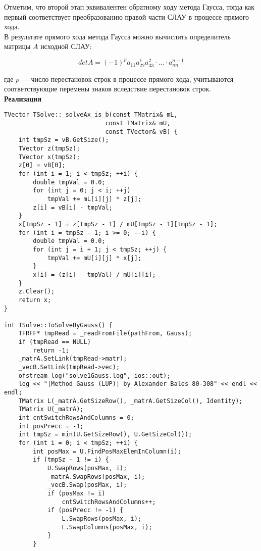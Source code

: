 Отметим, что второй этап эквивалентен обратному ходу метода Гаусса, тогда как первый соответствует преобразованию правой части СЛАУ в процессе прямого хода.\\

В результате прямого хода метода Гаусса можно вычислить определитель матрицы $A$ исходной СЛАУ:

$$
det A=(-1)^pa_{11}a_{22}^1a_{33}^2 \cdot ... \cdot a_{nn}^{n-1}
$$

где $p$ --- число перестановок строк в процессе прямого хода, учитываются соответствующие перемены знаков вследствие перестановок строк.\\

\textbf{Реализация}

\begin{lstlisting}
TVector TSolve::_solveAx_is_b(const TMatrix& mL, 
                            const TMatrix& mU, 
                            const TVector& vB) {
    int tmpSz = vB.GetSize();    
	TVector z(tmpSz);
    TVector x(tmpSz);
	z[0] = vB[0];	
    for (int i = 1; i < tmpSz; ++i) {
        double tmpVal = 0.0;
        for (int j = 0; j < i; ++j)
            tmpVal += mL[i][j] * z[j];
        z[i] = vB[i] - tmpVal;
    }    
    x[tmpSz - 1] = z[tmpSz - 1] / mU[tmpSz - 1][tmpSz - 1];    
    for (int i = tmpSz - 1; i >= 0; --i) {
        double tmpVal = 0.0;
        for (int j = i + 1; j < tmpSz; ++j) {
            tmpVal += mU[i][j] * x[j];
        }
        x[i] = (z[i] - tmpVal) / mU[i][i];
    }
    z.Clear();
    return x;
}

int TSolve::ToSolveByGauss() {                 
    TFRFF* tmpRead = _readFromFile(pathFrom, Gauss);
    if (tmpRead == NULL)
        return -1;
    _matrA.SetLink(tmpRead->matr);
    _vecB.SetLink(tmpRead->vec);
    ofstream log("solve1Gauss.log", ios::out);
    log << "|Method Gauss (LUP)| by Alexander Bales 80-308" << endl << endl;    
    TMatrix L(_matrA.GetSizeRow(), _matrA.GetSizeCol(), Identity); 
    TMatrix U(_matrA);           
    int cntSwitchRowsAndColumns = 0;
    int posPrecc = -1;
    int tmpSz = min(U.GetSizeRow(), U.GetSizeCol());    
    for (int i = 0; i < tmpSz; ++i) {
        int posMax = U.FindPosMaxElemInColumn(i);           
        if (tmpSz - 1 != i) {
            U.SwapRows(posMax, i);            
            _matrA.SwapRows(posMax, i);
            _vecB.Swap(posMax, i); 
            if (posMax != i)
                cntSwitchRowsAndColumns++;                
            if (posPrecc != -1) {
                L.SwapRows(posMax, i);
                L.SwapColumns(posMax, i);                            
            }               
        }
                                

\end{lstlisting}
